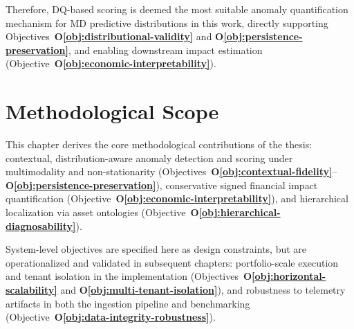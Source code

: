 Therefore, \ac{DQ}-based scoring is deemed the most suitable anomaly quantification
mechanism for \ac{MD} predictive distributions in this work, directly supporting
Objectives~\textbf{O\ref{obj:distributional-validity}} and
\textbf{O\ref{obj:persistence-preservation}}, and enabling downstream impact estimation
(Objective~\textbf{O\ref{obj:economic-interpretability}}).

\section{Methodological Scope}

This chapter derives the core methodological contributions of the thesis: contextual,
distribution-aware anomaly detection and scoring under multimodality and
non-stationarity (Objectives~\textbf{O\ref{obj:contextual-fidelity}}--
\textbf{O\ref{obj:persistence-preservation}}), conservative signed financial impact
quantification (Objective~\textbf{O\ref{obj:economic-interpretability}}), and
hierarchical localization via asset ontologies (Objective~\textbf{O\ref{obj:hierarchical-diagnosability}}).

System-level objectives are specified here as design constraints, but are
operationalized and validated in subsequent chapters: portfolio-scale execution and
tenant isolation in the implementation (Objectives~\textbf{O\ref{obj:horizontal-scalability}}
and \textbf{O\ref{obj:multi-tenant-isolation}}), and robustness to telemetry artifacts
in both the ingestion pipeline and benchmarking (Objective~\textbf{O\ref{obj:data-integrity-robustness}}).
